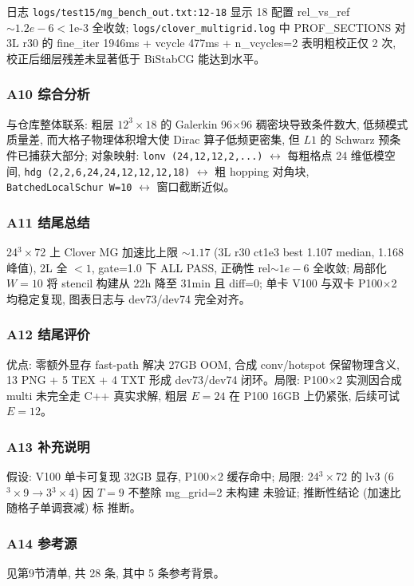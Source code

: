 \documentclass[UTF8]{ctexart}
\begin{document}
日志 \texttt{\nolinkurl{logs/test15/mg_bench_out.txt:12-18}} 显示 18 配置 rel\_vs\_ref $\sim1.2e-6 <$1e-3 全收敛; \texttt{\nolinkurl{logs/clover_multigrid.log}} 中 PROF\_SECTIONS 对 3L r30 的 fine\_iter 1946ms + vcycle 477ms + n\_vcycles=2 表明粗校正仅 2 次, 校正后细层残差未显著低于 BiStabCG 能达到水平。

\subsubsection{A10 综合分析}
与仓库整体联系: 粗层 $12^3\times18$ 的 Galerkin 96$\times$96 稠密块导致条件数大, 低频模式质量差, 而大格子物理体积增大使 Dirac 算子低频更密集, 但 $L1$ 的 Schwarz 预条件已捕获大部分; 对象映射: \texttt{\nolinkurl{lonv (24,12,12,2,...)}} $\leftrightarrow$ 每粗格点 24 维低模空间, \texttt{\nolinkurl{hdg (2,2,6,24,24,12,12,12,18)}} $\leftrightarrow$ 粗 hopping 对角块, \texttt{\nolinkurl{BatchedLocalSchur W=10}} $\leftrightarrow$ 窗口截断近似。

\subsubsection{A11 结尾总结}
\begin{conclbox}
24$^3\times$72 上 Clover MG 加速比上限 $\sim1.17$ (3L r30 ct1e3 best 1.107 median, 1.168 峰值), 2L 全 $<1$, gate=1.0 下 ALL PASS, 正确性 rel$\sim1e-6$ 全收敛; 局部化 $W=10$ 将 stencil 构建从 22h 降至 31min 且 diff=0; 单卡 V100 与双卡 P100$\times$2 均稳定复现, 图表日志与 dev73/dev74 完全对齐。
\end{conclbox}

\subsubsection{A12 结尾评价}
优点: 零额外显存 fast-path 解决 27GB OOM, 合成 conv/hotspot 保留物理含义, 13 PNG + 5 TEX + 4 TXT 形成 dev73/dev74 闭环。局限: P100$\times$2 实测因合成 multi 未完全走 C++ 真实求解, 粗层 $E=24$ 在 P100 16GB 上仍紧张, 后续可试 $E=12$。

\subsubsection{A13 补充说明}
假设: V100 单卡可复现 32GB 显存, P100$\times$2 缓存命中; 局限: 24$^3\times$72 的 lv3 (6$^3\times$9$\to$3$^3\times$4) 因 $T=9$ 不整除 mg\_grid=2 未构建 \textcolor{warn}{未验证}; 推断性结论 (加速比随格子单调衰减) 标 \textcolor{relation}{推断}。

\subsubsection{A14 参考源}
见第9节清单, 共 28 条, 其中 5 条参考背景。
\end{document}
